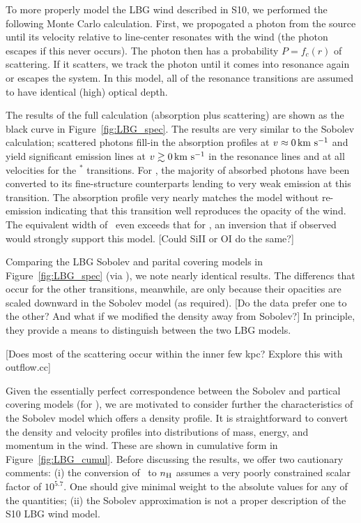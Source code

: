\documentclass[12pt,preprint]{aastex}
\begin{document}
To more properly model the LBG wind described in S10, we 
performed the following Monte Carlo calculation.  First, we propogated
a photon from the source until its velocity relative to line-center
resonates with the wind (the photon escapes if this never occurs).
The photon then has a probability $P = f_c(r)$ of scattering.  If it
scatters, we track the photon until it comes into
resonance again or escapes the system.  In this model, all of the
resonance transitions are assumed to have identical (high) optical
depth. 

The results of the full calculation (absorption plus scattering) are
shown as the black curve in Figure~\ref{fig:LBG_spec}.  The results
are very similar to the Sobolev calculation; scattered photons fill-in
the absorption profiles at $v \approx 0 \, {\rm km~s^{-1}}$ and yield significant
emission lines at $v \gtrsim 0 \, {\rm km~s^{-1}}$ in the resonance lines and at
all velocities for the $^*$ transitions.  For \feiia,
the majority of absorbed photons have been converted to its
fine-structure counterparts lending to very weak emission at this
transition. The absorption profile very nearly matches the
model without re-emission indicating that this transition well
reproduces the opacity of the wind.  
The equivalent width of \feiia\ even exceeds that for \feiib, an
inversion that if observed would strongly support this model.
[Could SiII or OI do the same?]

Comparing the LBG Sobolev and parital covering models in
Figure~\ref{fig:LBG_spec} (via \mgiia), we note nearly identical
results.  The differencs that occur for the other transitions,
meanwhile, are only because their opacities are scaled downward in the
Sobolev model (as required).  [Do the data prefer one to the other?
And what if we modified the density away from Sobolev?]
In principle, they provide a means to distinguish between the two LBG
models.  

[Does most of the scattering occur within the inner few kpc? Explore
this with outflow.cc]

Given the essentially perfect correspondence between the Sobolev and
partical covering models (for \mgiia), we are motivated to consider
further the characteristics of the Sobolev model which offers a
density profile.  It is straightforward to convert the density and
velocity profiles into distributions of mass, energy, and momentum in
the wind.  These are shown in cumulative form in
Figure~\ref{fig:LBG_cumul}.  Before discussing the results, we offer
two cautionary comments: (i) the conversion of \nmg\ to $n_{\rm H}$
assumes a very poorly constrained scalar factor of $10^{5.7}$.  One
should give minimal weight to the absolute values for any of the
quantities;
(ii) the Sobolev approximation is not a proper description of the S10
LBG wind model.
\end{document}
